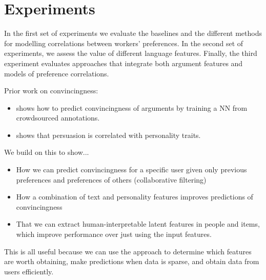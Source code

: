\section{Experiments}\label{sec:expts}

In the first set of experiments we evaluate the baselines and the different methods for modelling correlations between workers' preferences. In the second set of experiments, we assess the value of different language features. Finally, the third experiment evaluates approaches that integrate both argument features and models of preference correlations.

Prior work on convincingness:
\begin{itemize}
 \item \cite{habernal2016argument} shows how to predict convincingness of arguments by training a NN 
 from crowdsourced annotations. 
 \item \cite{lukin2017argument} shows that persuasion is correlated with personality traits.
\end{itemize}

We build on this to show...
\begin{itemize}
 \item How we can predict convincingness for a specific user given only previous preferences and 
 preferences of others (collaborative filtering)
 \item How a combination of text and personality features improves predictions of convincingness
 \item That we can extract human-interpretable latent features in people and items,
 which improve performance over just using the input features.
\end{itemize}
This is all useful because we can use the approach to determine which features are worth 
obtaining, make predictions when data is sparse, and obtain data from users efficiently.

